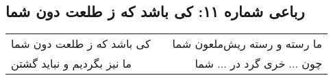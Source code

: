\begin{center}
\section*{رباعی شماره ۱۱: کی باشد که ز طلعت دون شما}
\label{sec:sh011}
\begin{longtable}{l p{0.5cm} r}
کی باشد که ز طلعت دون شما
&&
ما رسته و رسته ریش‌ملعون شما
\\
ما نیز بگردیم و نباید گشتن
&&
چون ... خری گرد در ... شما
\\
\end{longtable}
\end{center}
